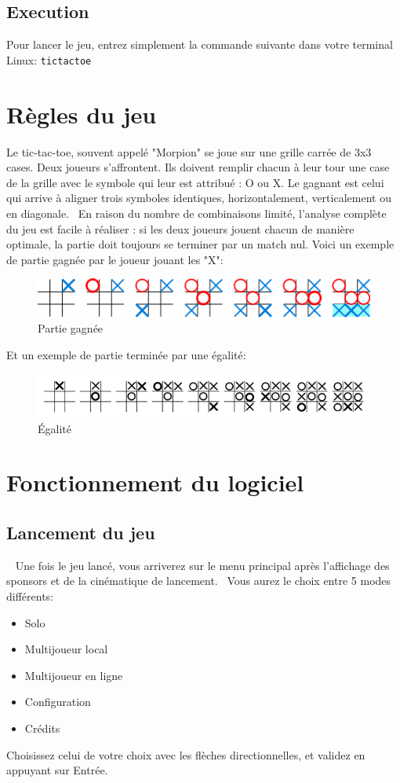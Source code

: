 \documentclass[a4paper,12pt]{article}
\begin{document}
\subsection{Execution}
Pour lancer le jeu, entrez simplement la commande suivante dans votre terminal Linux:
\verb+tictactoe+

\section{Règles du jeu}
Le tic-tac-toe, souvent appelé "Morpion" se joue sur une grille carrée de 3x3 cases. Deux joueurs s'affrontent. Ils doivent remplir chacun à leur tour une case de la grille avec le symbole qui leur est attribué : O ou X. Le gagnant est celui qui arrive à aligner trois symboles identiques, horizontalement, verticalement ou en diagonale.~\cite{wiki}
En raison du nombre de combinaisons limité, l'analyse complète du jeu est facile à réaliser : si les deux joueurs jouent chacun de manière optimale, la partie doit toujours se terminer par un match nul.
Voici un exemple de partie gagnée par le joueur jouant les "X":~
\begin{figure}[h]
	\includegraphics[scale=0.8]{1.png}
	\caption{Partie gagnée}
	\label{fig:partieGagnee}
\end{figure}

Et un exemple de partie terminée par une égalité:~
\begin{figure}[h]
	\includegraphics[scale=0.65]{2.png}
	\caption{\'Egalité}
	\label{fig:egalite}
\end{figure}
\section{Fonctionnement du logiciel}
\subsection{Lancement du jeu}~
Une fois le jeu lancé, vous arriverez sur le menu principal après l'affichage des sponsors et de la cinématique de lancement.~ 
Vous aurez le choix entre 5 modes différents:~\begin{itemize}
\item Solo
\item Multijoueur local
\item Multijoueur en ligne
\item Configuration
\item Crédits
\end{itemize}
Choisissez celui de votre choix avec les flèches directionnelles, et validez en appuyant sur Entrée.
\end{document}
